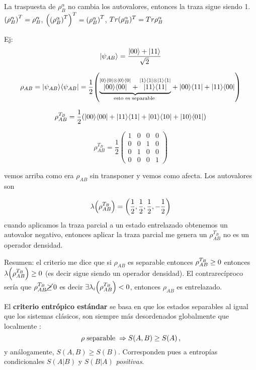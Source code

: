 La traspuesta de $\rho_{B}^{\alpha}$ no cambia los autovalores, entonces
la traza sigue siendo 1. $\PARENTESIS{\rho_{B}^{\alpha}}^{T}=\rho_{B}^{\alpha}$,
$\PARENTESIS{\PARENTESIS{\rho_{B}^{\alpha}}^{T}}^{T}=\PARENTESIS{\rho_{B}^{\alpha}}^{T}$,
$Tr\PARENTESIS{\rho_{B}^{\alpha}}{}^{T}=Tr\rho_{B}^{\alpha}$

Ej: 
\[
\KET{\psi_{AB}}=\frac{\KET{00}+\KET{11}}{\sqrt{2}}
\]

\[
\rho_{AB}=\PROYECT{\psi_{AB}}{\psi_{AB}}=\frac{1}{2}\PARENTESIS{\LLAVEABAJO{\overset{}{\overset{\KET 0\BRA 0\otimes\KET 0\BRA 0}{\PROYECT{00}{00}}+\overset{\KET 1\BRA 1\otimes\KET 1\BRA 1}{\PROYECT{11}{11}}}}{\text{esto es separable }}+\PROYECT{00}{11}+\PROYECT{11}{00}}
\]

\[
\rho_{AB}^{T_{B}}=\frac{1}{2}\PARENTESIS{\PROYECT{00}{00}+\PROYECT{11}{11}+\PROYECT{01}{10}+\PROYECT{10}{01}}
\]

\[
\rho_{AB}^{T_{B}}=\frac{1}{2}\left(\begin{array}{cccc}
1 & 0 & 0 & 0\\
0 & 0 & 1 & 0\\
0 & 1 & 0 & 0\\
0 & 0 & 0 & 1
\end{array}\right)
\]

vemos arriba como era $\rho_{AB}$ sin transponer y vemos como afecta.
Los autovalores son

\[
\lambda\PARENTESIS{\rho_{AB}^{T_{B}}}=\PARENTESIS{\frac{1}{2},\frac{1}{2},\frac{1}{2},-\frac{1}{2}}
\]
cuando aplicamos la traza parcial a un estado entrelazado obtenemos
un autovalor negativo, entonces aplicar la traza parcial me genera
un $\rho_{AB}^{T_{B}}$ no es un operador densidad.

Resumen: el criterio me dice que si $\rho_{AB}$ es separable entonces
$\rho_{AB}^{T_{B}}\protect\geq 0$ entonces $\lambda\protect\PARENTESIS{\rho_{AB}^{T_{B}}}\protect\geq0$ 
(es decir sigue siendo un operador densidad). El contrarecíproco sería
que  $\rho_{AB}^{T_{B}}\cancel{\protect\geq}\,0$  es decir 
$\exists\lambda_{i}\protect\PARENTESIS{\rho_{AB}^{T_{B}}}<0$,
entonces $\rho_{AB}$ es entrelazado.





El {\bf criterio entrópico estándar} se basa en que los estados separables al 
igual que los sistemas clásicos, son siempre más
desordenados globalmente que localmente \cite{Ho.96}:
\begin{equation}
 \rho\;{\rm separable}\;\Rightarrow S(A,B)\geq S(A)\,, \label{CS}\end{equation}
y análogamente, $S(A,B)\geq S(B)$. Corresponden pues a entropías condicionales
$S(A|B)$ y $S(B|A)$ {\it positivas}. 

